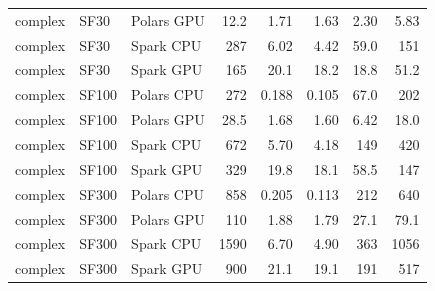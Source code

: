\begin{longtable}{lllrrrrr}
complex & SF30 & Polars GPU & 12.2 & 1.71 & 1.63 & 2.30 & 5.83 \\
complex & SF30 & Spark CPU & 287 & 6.02 & 4.42 & 59.0 & 151 \\
complex & SF30 & Spark GPU & 165 & 20.1 & 18.2 & 18.8 & 51.2 \\
complex & SF100 & Polars CPU & 272 & 0.188 & 0.105 & 67.0 & 202 \\
complex & SF100 & Polars GPU & 28.5 & 1.68 & 1.60 & 6.42 & 18.0 \\
complex & SF100 & Spark CPU & 672 & 5.70 & 4.18 & 149 & 420 \\
complex & SF100 & Spark GPU & 329 & 19.8 & 18.1 & 58.5 & 147 \\
complex & SF300 & Polars CPU & 858 & 0.205 & 0.113 & 212 & 640 \\
complex & SF300 & Polars GPU & 110 & 1.88 & 1.79 & 27.1 & 79.1 \\
complex & SF300 & Spark CPU & 1590 & 6.70 & 4.90 & 363 & 1056 \\
complex & SF300 & Spark GPU & 900 & 21.1 & 19.1 & 191 & 517 \\
\end{longtable}
